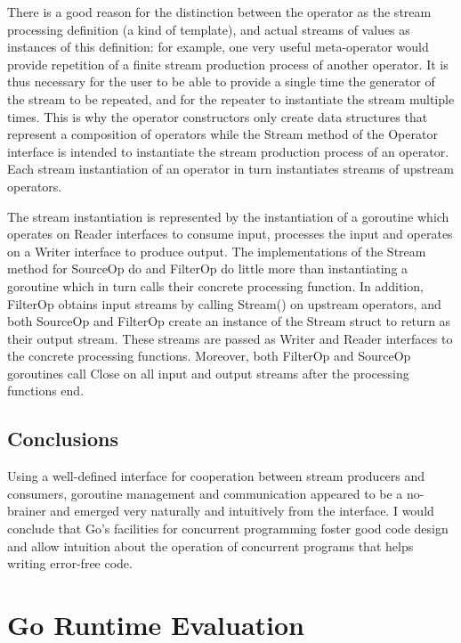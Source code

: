 \documentclass {article}
\begin{document}
There is a good reason for the distinction between the operator as the stream processing definition (a kind of template), and actual streams of values as instances of this definition: for example, one very useful meta-operator would provide repetition of a finite stream production process of another operator. It is thus necessary for the user to be able to provide a single time the generator of the stream to be repeated, and for the repeater to instantiate the stream multiple times. This is why the operator constructors only create data structures that represent a composition of operators while the Stream method of the Operator interface is intended to instantiate the stream production process of an operator. Each stream instantiation of an operator in turn instantiates streams of upstream operators.

The stream instantiation is represented by the instantiation of a goroutine which operates on Reader interfaces to consume input, processes the input and operates on a Writer interface to produce output. The implementations of the Stream method for SourceOp do and FilterOp do little more than instantiating a goroutine which in turn calls their concrete processing function. In addition, FilterOp obtains input streams by calling Stream() on upstream operators, and both SourceOp and FilterOp create an instance of the Stream struct to return as their output stream. These streams are passed as Writer and Reader interfaces to the concrete processing functions. Moreover, both FilterOp and SourceOp goroutines call Close on all input and output streams after the processing functions end.

\subsection{Conclusions}

Using a well-defined interface for cooperation between stream producers and consumers, goroutine management and communication appeared to be a no-brainer and emerged very naturally and intuitively from the interface. I would conclude that Go's facilities for concurrent programming foster good code design and allow intuition about the operation of concurrent programs that helps writing error-free code.

\section{Go Runtime Evaluation}
\label{sec:runtime}
\end{document}

